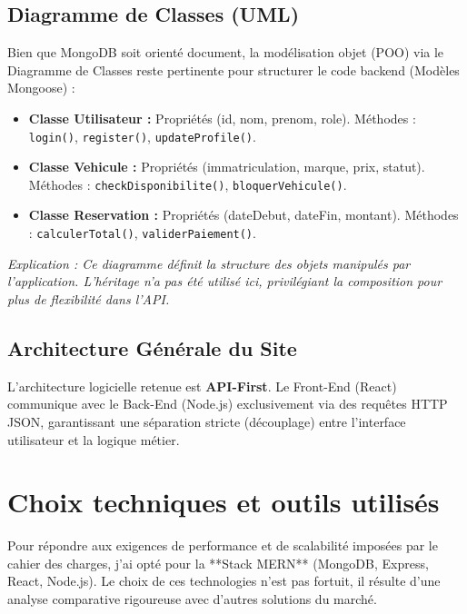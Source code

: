 \documentclass[12pt, a4paper]{report}
\begin{document}
\section{Diagramme de Classes (UML)}
Bien que MongoDB soit orienté document, la modélisation objet (POO) via le Diagramme de Classes reste pertinente pour structurer le code backend (Modèles Mongoose) :
\begin{itemize}
    \item \textbf{Classe Utilisateur :} Propriétés (id, nom, prenom, role). Méthodes : \texttt{login()}, \texttt{register()}, \texttt{updateProfile()}.
    \item \textbf{Classe Vehicule :} Propriétés (immatriculation, marque, prix, statut). Méthodes : \texttt{checkDisponibilite()}, \texttt{bloquerVehicule()}.
    \item \textbf{Classe Reservation :} Propriétés (dateDebut, dateFin, montant). Méthodes : \texttt{calculerTotal()}, \texttt{validerPaiement()}.
\end{itemize}
\textit{Explication : Ce diagramme définit la structure des objets manipulés par l'application. L'héritage n'a pas été utilisé ici, privilégiant la composition pour plus de flexibilité dans l'API.}

\section{Architecture Générale du Site}
L'architecture logicielle retenue est \textbf{API-First}. Le Front-End (React) communique avec le Back-End (Node.js) exclusivement via des requêtes HTTP JSON, garantissant une séparation stricte (découplage) entre l'interface utilisateur et la logique métier.

\chapter{Choix techniques et outils utilisés}

Pour répondre aux exigences de performance et de scalabilité imposées par le cahier des charges, j'ai opté pour la **Stack MERN** (MongoDB, Express, React, Node.js). Le choix de ces technologies n'est pas fortuit, il résulte d'une analyse comparative rigoureuse avec d'autres solutions du marché.
\end{document}
